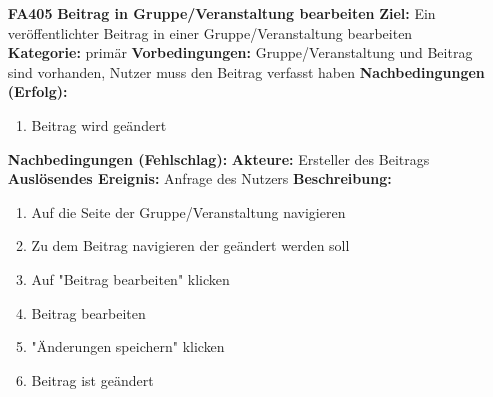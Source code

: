 \documentclass[parskip=full]{scrartcl}
\begin{document}
\begin{itemize}[nosep]
			\item[\textbf{FA405}]\textbf{Beitrag in Gruppe/Veranstaltung bearbeiten}
			\newline \textbf{Ziel:} Ein veröffentlichter Beitrag in einer Gruppe/Veranstaltung bearbeiten
			\newline \textbf{Kategorie:} primär
			\newline \textbf{Vorbedingungen:} Gruppe/Veranstaltung und Beitrag sind vorhanden, Nutzer muss den Beitrag verfasst haben
			\newline \textbf{Nachbedingungen (Erfolg):}
			\begin{enumerate}[nosep]
				\item Beitrag wird geändert
			\end{enumerate}
			\textbf{Nachbedingungen (Fehlschlag):}
			\newline \textbf{Akteure:} Ersteller des Beitrags
			\newline \textbf{Auslösendes Ereignis:} Anfrage des Nutzers
			\newline \textbf{Beschreibung:}
			\begin{enumerate}[nosep]
				\item Auf die Seite der Gruppe/Veranstaltung navigieren
				\item Zu dem Beitrag navigieren der geändert werden soll
				\item Auf "Beitrag bearbeiten" klicken
				\item Beitrag bearbeiten
				\item "Änderungen speichern" klicken
				\item Beitrag ist geändert\\
			\end{enumerate}
	

\end{itemize}
\end{document}
